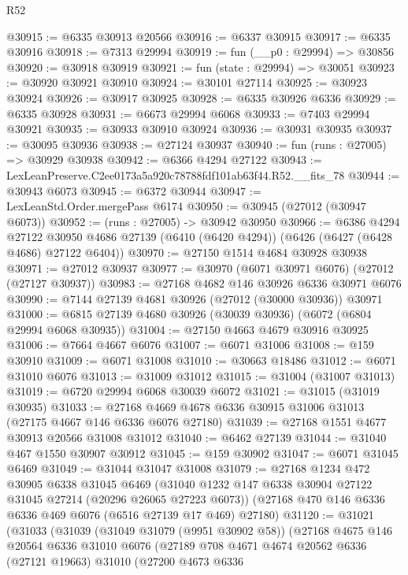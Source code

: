 \begin{lexlean}{R52}
\begin{coremodule}
@30915 := @6335 @30913 @20566
@30916 := @6337 @30915
@30917 := @6335 @30916
@30918 := @7313 @29994
@30919 := fun (__p0 : @29994) => @30856
@30920 := @30918 @30919
@30921 := fun (state : @29994) => @30051
@30923 := @30920 @30921 @30910
@30924 := @30101 @27114
@30925 := @30923 @30924
@30926 := @30917 @30925
@30928 := @6335 @30926 @6336
@30929 := @6335 @30928
@30931 := @6673 @29994 @6068
@30933 := @7403 @29994 @30921
@30935 := @30933 @30910 @30924
@30936 := @30931 @30935
@30937 := @30095 @30936
@30938 := @27124 @30937
@30940 := fun (runs : @27005) => @30929 @30938
@30942 := @6366 @4294 @27122
@30943 := LexLeanPreserve.C2ee0173a5a920c78788fdf101ab63f44.R52.__fits_78
@30944 := @30943 @6073
@30945 := @6372 @30944
@30947 := LexLeanStd.Order.mergePass @6174
@30950 := @30945 (@27012 (@30947 @6073))
@30952 := (runs : @27005) -> @30942 @30950
@30966 := @6386
    @4294
    @27122
    @30950
    @4686
    @27139
    (@6410 (@6420 @4294))
    (@6426 (@6427 (@6428 @4686) @27122 @6404))
@30970 := @27150 @1514 @4684 @30928 @30938
@30971 := @27012 @30937
@30977 := @30970 (@6071 @30971 @6076) (@27012 (@27127 @30937))
@30983 := @27168 @4682 @146 @30926 @6336 @30971 @6076
@30990 := @7144 @27139 @4681 @30926 (@27012 (@30000 @30936)) @30971
@31000 := @6815 @27139 @4680 @30926 (@30039 @30936) (@6072 (@6804 @29994 @6068 @30935))
@31004 := @27150 @4663 @4679 @30916 @30925
@31006 := @7664 @4667 @6076
@31007 := @6071 @31006
@31008 := @159 @30910
@31009 := @6071 @31008
@31010 := @30663 @18486
@31012 := @6071 @31010 @6076
@31013 := @31009 @31012
@31015 := @31004 (@31007 @31013)
@31019 := @6720 @29994 @6068 @30039 @6072
@31021 := @31015 (@31019 @30935)
@31033 := @27168 @4669 @4678 @6336 @30915 @31006 @31013 (@27175 @4667 @146 @6336 @6076 @27180)
@31039 := @27168 @1551 @4677 @30913 @20566 @31008 @31012
@31040 := @6462 @27139
@31044 := @31040 @467 @1550 @30907 @30912
@31045 := @159 @30902
@31047 := @6071 @31045 @6469
@31049 := @31044 @31047 @31008
@31079 := @27168
    @1234
    @472
    @30905
    @6338
    @31045
    @6469
    (@31040 @1232 @147 @6338 @30904 @27122 @31045 @27214 (@20296 @26065 @27223 @6073))
    (@27168 @470 @146 @6336 @6336 @469 @6076 (@6516 @27139 @17 @469) @27180)
@31120 := @31021
    (@31033
      (@31039
        (@31049 @31079 (@9951 @30902 @58))
        (@27168
          @4675
          @146
          @20564
          @6336
          @31010
          @6076
          (@27189
            @708
            @4671
            @4674
            @20562
            @6336
            (@27121 @19663)
            @31010
            (@27200
              @4673
              @6336

\end{coremodule}
\end{lexlean}
